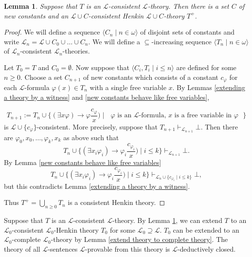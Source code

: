 \documentclass[a4paper, 11pt]{amsart}
\newtheorem{lemma}[lemma]{Lemma}
\theoremstyle{remark}
\newcommand{\cL}{\mathcal L}
\begin{document}
\begin{lemma} 
\label{extend consistent theory to Henkin theory} 
Suppose that $T$ is an $\cL$-consistent $\cL$-theory. 
Then there is a set $C$ of new constants and an $\cL\cup C$-consistent Henkin $\cL\cup C$-theory $T^+$. 
\end{lemma} 
\begin{proof} 
We will define a sequence $\langle C_n\mid n\in\omega\rangle$ of disjoint sets of constants and write $\cL_n= \cL\cup C_0\cup \dots \cup C_n$. 
We will define a $\subseteq$-increasing sequence $\langle T_n\mid n\in\omega\rangle$ of $\cL_n $-consistent $\cL_n $-theories. 

Let $T_0=T$ and $C_0=\emptyset$. 
Now suppose that $\langle C_i, T_i\mid i \leq n\rangle$ are defined for some $n\geq 0$. 
Choose a set $C_{n+1}$ of new constants which consists of a constant $c_{\varphi}$ for each $\cL$-formula $\varphi(x) \in T_n$ with a single free variable $x$. 
By Lemmas \ref{extending a theory by a witness} and \ref{new constants behave like free variables}, 

$$ T_{n+1} := T_n \cup \{ (\exists x \varphi) \rightarrow \varphi \frac{c_{\varphi}}{x}) \mid \text{ $\varphi$ is an $\cL$-formula, $x$ is a free variable in $\varphi$ }    \}   $$
is $\cL\cup \{c_{\varphi} \} $-consistent. 
More precisely, suppose that $T_{n+1} \vdash_{\cL_{n+1}} \bot$. 
Then there are $\varphi_0,x_0,\dots,\varphi_k,x_k$ as above such that 
$$T_n \cup \{ (\exists x_i \varphi_i) \rightarrow \varphi_i \frac{c_{\varphi_i}}{x}) \mid i\leq k \} \vdash_{\cL_{n+1}} \bot.$$ 
By Lemma \ref{new constants behave like free variables} 
$$T_n \cup \{ (\exists x_i \varphi_i) \rightarrow \varphi_i \frac{c_{\varphi_i}}{x}) \mid i\leq k \} \vdash_{\cL_{n} \cup \{ c_{\varphi_i} \mid i\leq k \}} \bot,$$ 
but this contradicts Lemma \ref{extending a theory by a witness}. 

Thus $T^+=\bigcup_{n\geq 0} T_n$ is a consistent Henkin theory. 
\end{proof} 




Suppose that $T$ is an $\cL$-consistent $\cL$-theory. 
By Lemma \ref{extend consistent theory to Henkin theory}, we can extend $T$ to an  $\cL_0$-consistent $\cL_0$-Henkin theory $T_0$ for some $\cL_0\supseteq \cL$. 
$T_0$ can be extended to an $\cL_0$-complete $\cL_0$-theory by Lemma \ref{extend theory to complete theory}. 
The theory of all $\cL$-sentences $\cL$-provable from this theory is $\cL$-deductively closed. 
\end{document}
